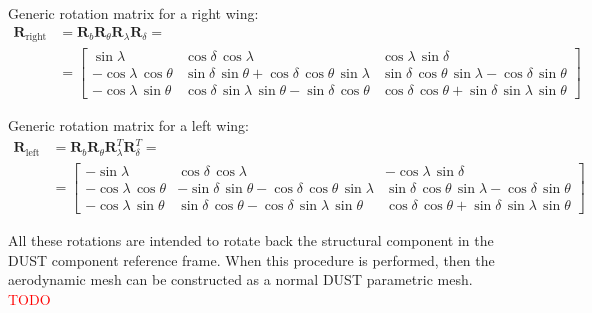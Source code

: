Generic rotation matrix for a right wing: 
\begin{align*}
    \mathbf{R}_{\text{right}}& =   \mathbf{R}_{b}\mathbf{R}_{\theta}\mathbf{R}_{\lambda}\mathbf{R}_{\delta} = \\
    &=\begin{bmatrix}
    \sin\lambda  & 
    \cos\delta \,\cos\lambda  & 
    \cos\lambda \,\sin\delta \\
    -\cos\lambda \,\cos\theta  & 
    \sin\delta \,\sin\theta +\cos\delta \,\cos\theta \,\sin\lambda  & 
    \sin\delta \,\cos\theta \,\sin\lambda -\cos\delta \,\sin\theta \\ 
    -\cos\lambda \,\sin\theta  & 
    \cos\delta \,\sin\lambda \,\sin\theta -\sin\delta \,\cos\theta  & 
    \cos\delta \,\cos\theta +\sin\delta \,\sin\lambda \,\sin\theta
    \end{bmatrix}
\end{align*}

Generic rotation matrix for a left wing: 
\begin{align*}
    \mathbf{R}_{\text{left}}&=   \mathbf{R}_{b}\mathbf{R}_{\theta}\mathbf{R}_{\lambda}^T\mathbf{R}_{\delta}^T =\\
    &=\begin{bmatrix} 
    -\sin\lambda  &
    \cos\delta \,\cos\lambda  &
    -\cos\lambda \,\sin\delta \\
    -\cos\lambda \,\cos\theta  & 
    -\sin\delta \,\sin\theta -\cos\delta \,\cos\theta \,\sin\lambda  & 
    \sin\delta \,\cos\theta \,\sin\lambda -\cos\delta \,\sin\theta \\ 
    -\cos\lambda \,\sin\theta  & 
    \sin\delta \,\cos\theta -\cos\delta \,\sin\lambda \,\sin\theta  &
    \cos\delta \,\cos\theta +\sin\delta \,\sin\lambda \,\sin\theta  
    \end{bmatrix}
\end{align*}

All these rotations are intended to rotate back the structural component in the DUST component reference frame. When this procedure is performed, then the aerodynamic mesh can be constructed as a normal DUST parametric mesh. 
\textcolor{red}{TODO}


